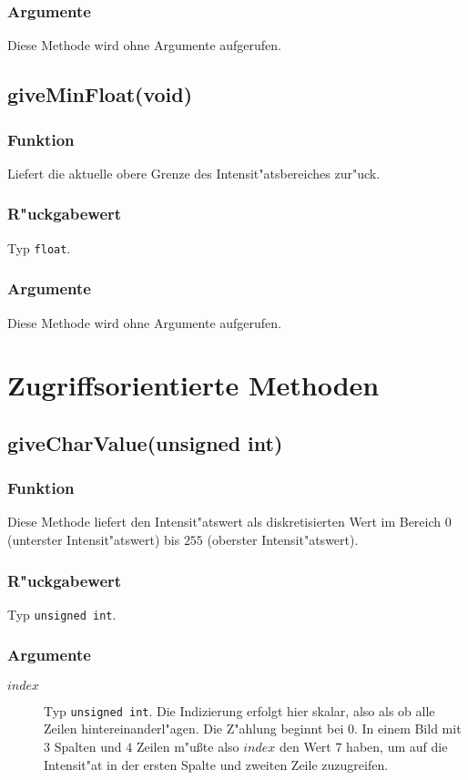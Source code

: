 \documentclass[12pt,a4paper,draft,twoside,onecolumn,titlepage]{book}
\newcommand{\carg}[1]{$ #1 $}
\newcommand{\ctyp}[1]{{\tt #1}}
\newcommand{\arglist}[1]{\footnotesize{#1}}
\begin{document}
\subsubsection{Argumente}
Diese Methode wird ohne Argumente aufgerufen.
\subsection{giveMinFloat\arglist{(void)}}
\subsubsection{Funktion}
Liefert die aktuelle obere Grenze des Intensit"atsbereiches zur"uck.
\subsubsection{R"uckgabewert}
Typ \ctyp{float}.
\subsubsection{Argumente}
Diese Methode wird ohne Argumente aufgerufen.
\section{Zugriffsorientierte Methoden}
\label{ebbandsinglem}
\subsection{giveCharValue\arglist{(unsigned int)}}
\subsubsection{Funktion}
Diese Methode liefert den Intensit"atswert als diskretisierten Wert im Bereich $0$ (unterster Intensit"atswert) bis $255$ (oberster Intensit"atswert).
\subsubsection{R"uckgabewert}
Typ \ctyp{unsigned int}. 
\subsubsection{Argumente}
\begin{description}
\item[\carg{index}]{Typ \ctyp{unsigned int}.  Die Indizierung erfolgt hier skalar, also als ob alle Zeilen hintereinanderl"agen. Die Z"ahlung beginnt bei $0$. In einem Bild mit $3$ Spalten und $4$ Zeilen m"u{\ss}te also \carg{index} den Wert $7$ haben, um auf die Intensit"at in der ersten Spalte und zweiten Zeile zuzugreifen.} 
\end{description}
\end{document}

